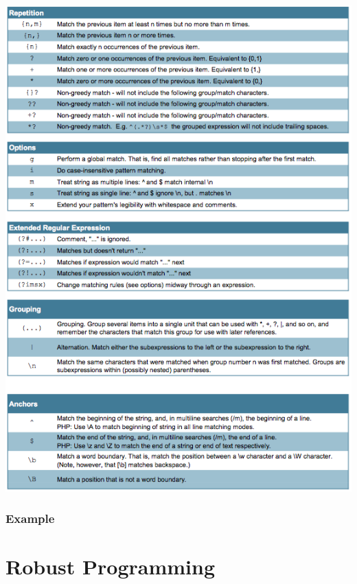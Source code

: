 \documentclass[10pt]{article}
\begin{document}
\begin{center}
	\includegraphics[scale=0.75]{regex2.png}
\end{center}
\subsubsection{Example}


\newpage
\section{Robust Programming}
\end{document}
